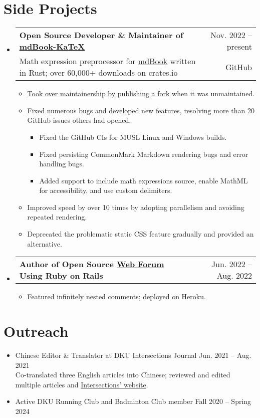\documentclass[letterpaper,11pt]{article}
\makeatletter
\newcommand{\CVItem}[1]{
  \item{\small
    {#1 \vspace{-2pt}}
  }
}
\newcommand{\CVSubheadingFrame}[1]{
  \vspace{-2pt}\item
    \begin{tabular*}{0.97\textwidth}[t]{l@{\extracolsep{\fill}}r}
        #1
    \end{tabular*}\vspace{-7pt}
}
\newcommand{\CVSubheading}[4]{\CVSubheadingFrame
    {\textbf{#1} & #2 \\
        \small#3 & #4 \\
    }}
\newcommand{\CVSubHeadingListStart}{\begin{itemize}[leftmargin=0.5cm, label={}]}
\newcommand{\CVSubHeadingListEnd}{\end{itemize}}
\newcommand{\CVItemListStart}{\begin{itemize}}
\newcommand{\CVItemListEnd}{\end{itemize}\vspace{-5pt}}
\newcommand{\uhref}[2]{\href{#1}{\underline{#2}}}
\makeatother
\begin{document}
\section{Side Projects}
\CVSubHeadingListStart
\CVSubheading
{Open Source Developer \& Maintainer of
    \uhref{https://github.com/lzanini/mdbook-katex}{mdBook-KaTeX}
}{Nov. 2022 -- present}
{Math expression preprocessor for
    \uhref{https://github.com/rust-lang/mdBook}{mdBook} written in Rust;
    over 60,000+ downloads on crates.io
}{GitHub}
\CVItemListStart
\CVItem
{\uhref{https://github.com/lzanini/mdbook-katex/issues/37}
    {Took over maintainership by publishing a fork} when
    it was unmaintained.
}
\CVItem
{Fixed numerous bugs and developed new features,
    resolving more than 20 GitHub issues others had opened.
    \begin{itemize}
        \item Fixed the GitHub CIs for MUSL Linux and Windows builds.
        \item Fixed persisting CommonMark Markdown rendering bugs and
        error handling bugs.
        \item Added support to include math expressions source,
        enable MathML for accessibility, and use custom delimiters.
    \end{itemize}
}
\CVItem
{Improved speed by over 10 times by adopting parallelism and
    avoiding repeated rendering.
}
\CVItem
{Deprecated the problematic static CSS feature gradually and provided an
    alternative.
}
\CVItemListEnd

\CVSubheadingFrame
{\textbf{Author of Open Source \uhref{https://github.com/SichangHe/rails_forum}
        {Web Forum} Using Ruby on Rails}&
    Jun. 2022 -- Aug. 2022
}
\CVItemListStart
\CVItem
{Featured infinitely nested comments;
    deployed on Heroku.
}
\CVItemListEnd
\CVSubHeadingListEnd

\section{Outreach}
\begin{itemize}
    \item Chinese Editor \& Translator at DKU Intersections Journal\hfill
    Jun. 2021 -- Aug. 2021\\{\small
    Co-translated three English articles into Chinese;
    reviewed and edited multiple articles and
    \uhref{https://sites.duke.edu/intersections/}{Intersections' website}.
    }
    \vspace{-4pt}
    \item Active DKU Running Club and Badminton Club member\hfill
    Fall 2020 -- Spring 2024
    \vspace{-4pt}
\end{itemize}
\end{document}
